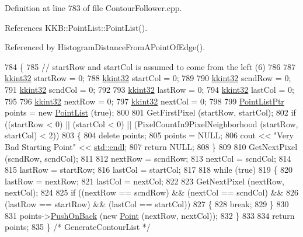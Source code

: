 Definition at line 783 of file Contour\+Follower.\+cpp.



References K\+K\+B\+::\+Point\+List\+::\+Point\+List().



Referenced by Histogram\+Distance\+From\+A\+Point\+Of\+Edge().


\begin{DoxyCode}
784 \{
785   \textcolor{comment}{// startRow and startCol is assumed to come from the left (6)}
786 
787   \hyperlink{namespace_k_k_b_a8fa4952cc84fda1de4bec1fbdd8d5b1b}{kkint32}  startRow = 0;
788   \hyperlink{namespace_k_k_b_a8fa4952cc84fda1de4bec1fbdd8d5b1b}{kkint32}  startCol = 0;
789 
790   \hyperlink{namespace_k_k_b_a8fa4952cc84fda1de4bec1fbdd8d5b1b}{kkint32}  scndRow  = 0;
791   \hyperlink{namespace_k_k_b_a8fa4952cc84fda1de4bec1fbdd8d5b1b}{kkint32}  scndCol  = 0;
792 
793   \hyperlink{namespace_k_k_b_a8fa4952cc84fda1de4bec1fbdd8d5b1b}{kkint32}  lastRow  = 0;
794   \hyperlink{namespace_k_k_b_a8fa4952cc84fda1de4bec1fbdd8d5b1b}{kkint32}  lastCol  = 0;
795 
796   \hyperlink{namespace_k_k_b_a8fa4952cc84fda1de4bec1fbdd8d5b1b}{kkint32}  nextRow  = 0;
797   \hyperlink{namespace_k_k_b_a8fa4952cc84fda1de4bec1fbdd8d5b1b}{kkint32}  nextCol  = 0;
798 
799   \hyperlink{class_k_k_b_1_1_point_list}{PointListPtr}  points = \textcolor{keyword}{new} \hyperlink{class_k_k_b_1_1_point_list}{PointList} (\textcolor{keyword}{true});
800 
801   GetFirstPixel (startRow, startCol);
802   \textcolor{keywordflow}{if}  ((startRow < 0)  ||  (startCol < 0)  ||  (PixelCountIn9PixelNeighborhood (startRow, startCol) < 2))
803   \{
804     \textcolor{keyword}{delete}  points;
805     points = NULL;
806     cout << \textcolor{stringliteral}{"Very Bad Starting Point"} << \hyperlink{namespace_k_k_b_ad1f50f65af6adc8fa9e6f62d007818a8}{std::endl};
807     \textcolor{keywordflow}{return}  NULL;
808   \}
809 
810   GetNextPixel (scndRow, scndCol);
811 
812   nextRow = scndRow;
813   nextCol = scndCol;
814 
815   lastRow = startRow;
816   lastCol = startCol;
817 
818   \textcolor{keywordflow}{while}  (\textcolor{keyword}{true})  
819   \{
820     lastRow = nextRow;
821     lastCol = nextCol;
822 
823     GetNextPixel (nextRow, nextCol);
824 
825     \textcolor{keywordflow}{if}  ((nextRow == scndRow)   &&  (nextCol == scndCol)  &&
826          (lastRow == startRow)  &&  (lastCol == startCol))
827     \{
828       \textcolor{keywordflow}{break};
829     \}
830 
831     points->\hyperlink{class_k_k_b_1_1_k_k_queue_aa9fba4632b54268bf71ecb42dee0b575}{PushOnBack} (\textcolor{keyword}{new} \hyperlink{class_k_k_b_1_1_point}{Point} (nextRow, nextCol));
832   \}
833 
834   \textcolor{keywordflow}{return}  points;
835 \}  \textcolor{comment}{/* GenerateContourList */}
\end{DoxyCode}
